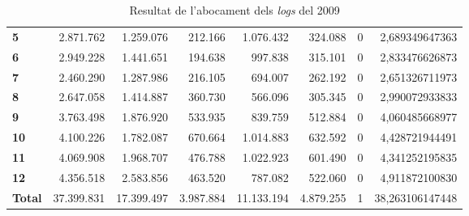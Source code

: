 \begin{table}[h!]
\begin{adjustbox}{width=1.5\textwidth, center}
\begin{tabular}{|l|r|r|r|r|r|r|r|}
            \midrule
            \textbf{5}     & 2.871.762  & 1.259.076  & 212.166   & 1.076.432  & 324.088   & 0 & 2,689349647363  \\
            \textbf{6}     & 2.949.228  & 1.441.651  & 194.638   & 997.838    & 315.101   & 0 & 2,833476626873  \\
            \textbf{7}     & 2.460.290  & 1.287.986  & 216.105   & 694.007    & 262.192   & 0 & 2,651326711973  \\
            \textbf{8}     & 2.647.058  & 1.414.887  & 360.730   & 566.096    & 305.345   & 0 & 2,990072933833  \\
            \midrule
            \textbf{9}     & 3.763.498  & 1.876.920  & 533.935   & 839.759    & 512.884   & 0 & 4,060485668977  \\
            \textbf{10}    & 4.100.226  & 1.782.087  & 670.664   & 1.014.883  & 632.592   & 0 & 4,428721944491  \\
            \textbf{11}    & 4.069.908  & 1.968.707  & 476.788   & 1.022.923  & 601.490   & 0 & 4,341252195835  \\
            \textbf{12}    & 4.356.518  & 2.583.856  & 463.520   & 787.082    & 522.060   & 0 & 4,911872100830  \\
            \midrule
            \textbf{Total} & 37.399.831 & 17.399.497 & 3.987.884 & 11.133.194 & 4.879.255 & 1 & 38,263106147448 \\
            \bottomrule
        \end{tabular}
    \end{adjustbox}
    \caption{Resultat de l'abocament dels \textit{logs} del 2009}
    \label{tab:logs-table-2009}
\end{table}
